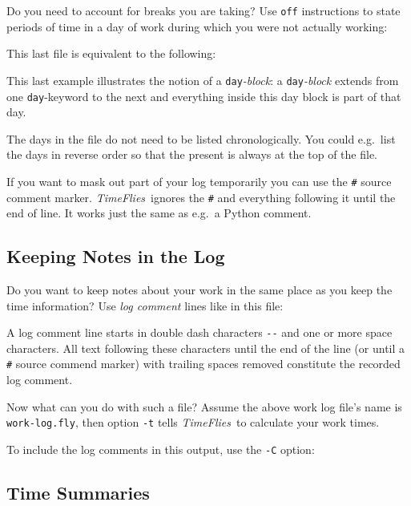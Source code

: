 \documentclass[11pt]{article}
\newcommand{\timeflies}{\emph{TimeFlies}}
\begin{document}
Do you need to account for breaks you are taking? Use \verb-off- instructions to state periods of time in a day of work during which you were not actually working:



This last file is equivalent to the following:



This last example illustrates the notion of a \verb-day-\emph{-block}: a \verb-day-\emph{-block} extends
from one \verb-day--keyword to the next and everything inside this day block is part of that day.

The days in the file do not need to be listed chronologically. You could e.g.\ list the days in reverse order so that the present is always at the top of the file.

If you want to mask out part of your log temporarily you can use the \verb-#- source comment marker. \timeflies\ ignores the \verb-#- and everything following it until the end of line. It works just the same as e.g.\ a Python comment.



\subsection{Keeping Notes in the Log}

Do you want to keep notes about your work in the same place as you keep the time information? Use \emph{log comment} lines like in this file:



A log comment line starts in double dash characters \verb=--= and one or more space characters. All text following these characters until the end of the line (or until a \verb-#- source commend marker) with trailing spaces removed constitute the recorded log comment.

Now what can you do with such a file? Assume the above work log file's name is \verb:work-log.fly:, then option \verb:-t: tells \timeflies\ to calculate your work times.



To include the log comments in this output, use the \verb=-C= option:



\subsection{Time Summaries}
\end{document}
